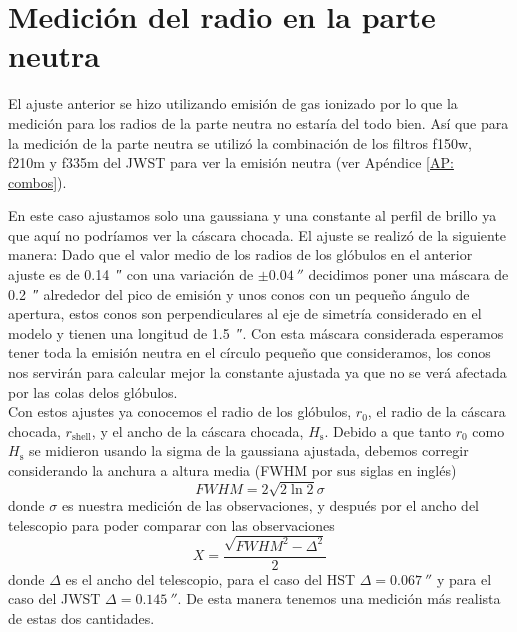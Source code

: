 \documentclass{book}
\begin{document}
\section{Medición del radio en la parte neutra} \label{Sec : radio neutro}

El ajuste anterior se hizo utilizando emisión de gas ionizado por lo que la medición para los radios de la parte neutra no estaría del todo bien. Así que para la medición de la parte neutra se utilizó la combinación de los filtros f150w, f210m y f335m del JWST para ver la emisión neutra (ver Apéndice \ref{AP: combos}). 

En este caso ajustamos solo una gaussiana y una constante al perfil de brillo ya que aquí no podríamos ver la cáscara chocada. El ajuste se realizó de la siguiente manera: Dado que el valor medio de los radios de los glóbulos en el anterior ajuste es de  \SI{0.14}{\arcsecond} con una variación de $\pm\SI{0.04}{\arcsecond}$ decidimos poner una máscara de \SI{0.2}{\arcsecond} alrededor del pico de emisión y unos conos con un pequeño ángulo de apertura, estos conos son perpendiculares al eje de simetría considerado en el modelo y tienen una longitud de \SI{1.5}{\arcsecond}. Con esta máscara considerada esperamos tener toda la emisión neutra en el círculo pequeño que consideramos, los conos nos servirán para calcular mejor la constante ajustada ya que no se verá afectada por las colas delos glóbulos. \\

Con estos ajustes ya conocemos el radio de los glóbulos, $r_0$, el radio de la cáscara chocada, $r_\mathrm{shell}$, y el ancho de la cáscara chocada, $H_\mathrm{s}$.  
Debido a que tanto  $r_0$ como  $H_\mathrm{s}$ se midieron usando la sigma de la gaussiana ajustada, debemos corregir considerando  la anchura a altura media (FWHM por sus siglas en inglés)
\begin{equation}
    FWHM= 2\sqrt{2\ln{2}}\sigma
\end{equation}
donde $\sigma$ es nuestra medición de las observaciones, y después por el ancho del telescopio para poder comparar con las observaciones
\begin{equation}
    X = \frac{\sqrt{FWHM^2-\Delta^2}}{2}
\end{equation}
donde $\Delta$ es el ancho del telescopio, para el caso del HST $\Delta=\SI{0.067}{\arcsecond}$ y para el caso del JWST $\Delta=\SI{0.145}{\arcsecond}$. De esta manera tenemos una medición más realista de estas dos cantidades.
\end{document}
